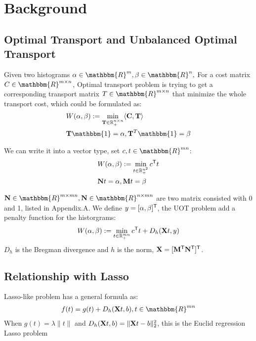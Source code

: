 \section{Background}
\subsection{Optimal Transport and Unbalanced Optimal Transport}
Given two histograms $\alpha \in \mathbbm{R}^{m}, \beta \in \mathbbm{R}^{n},$ For a cost matrix $C \in \mathbbm{R}^{m \times n}$, Optimal transport problem is trying to get a corresponding transport matrix $T \in \mathbbm{R}^{m \times n}$ that minimize the whole transport cost, which could be formulated as:
$$
\begin{aligned}
&W(\alpha,\beta) := \min_{ \mathbf{T} \in \mathbb{R}_{+}^{n \times n}} \langle \C, \mathbf{T} \rangle \\
& \mathbf{T} \mathbbm{1} = \alpha, \mathbf{T}^{T}\mathbbm{1} = \beta
\end{aligned}
$$

We can write it into a vector type, set $c,t \in \mathbbm{R}^{mn}$:
$$
\begin{aligned}
&W(\alpha,\beta) := \min_{t \in \mathbb{R}_{+}^{n^2}} c^{\mathsf T}t \\
& \mathbf{N}t = \alpha, \mathbf{M}t = \beta
\end{aligned}
$$

$\mathbf{N} \in \mathbbm{R}^{m \times mn}, \mathbf{N} \in \mathbbm{R}^{n \times mn}$ are two matrix consisted with 0 and 1, listed in Appendix.A. We define $y = [\alpha, \beta]^{\mathsf T}$, the UOT problem add a penalty function for the historgrams: 
\begin{equation}
\label{eq:uot}
W(\alpha,\beta) := \min_{t \in \mathbb{R}_{+}^{mn}} c^{\mathsf T}t + D_h(\mathbf{X}t,y)
\end{equation}
$D_h$ is the Bregman divergence and $h$ is the norm, $\mathbf{X} = [\mathbf{M}^{\mathsf T} \mathbf{N}^{\mathsf T}]^{\mathsf T}$.

\subsection{Relationship with Lasso}
Lasso-like problem has a general formula as:
$$
\begin{aligned}
f(t) = g(t) + D_h(\X t,b), t\in \mathbbm{R}^{mn}
\end{aligned}
$$
When $g(t) = \lambda \|t\|$ and $D_h(\mathbf{X} t,b) = \|\mathbf{X} t-b\|_2^2$, this is the Euclid regression Lasso problem


